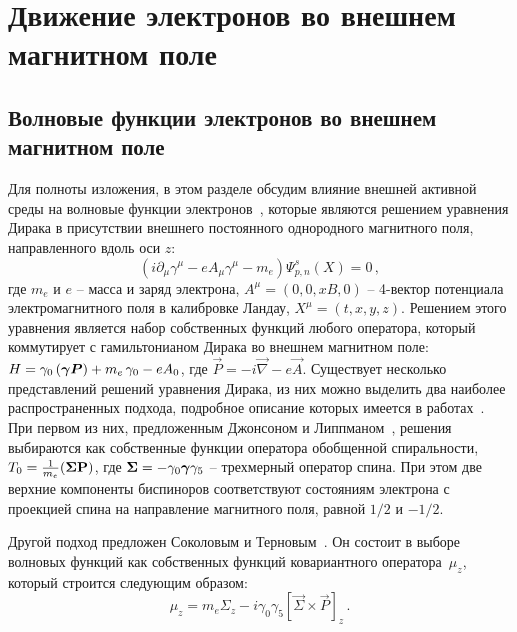\section{Движение электронов во внешнем магнитном поле}\label{Ch:Fermion}
\subsection{Волновые функции электронов во внешнем магнитном поле}
Для полноты изложения, в этом разделе обсудим влияние внешней активной среды на волновые функции электронов~\cite{KM_Book_2013}, которые являются решением уравнения Дирака в присутствии внешнего постоянного однородного магнитного поля, направленного вдоль оси $z$:
\begin{equation}\label{eq:Dirac}
	(i\partial_\mu \gamma^\mu -e A_\mu \gamma^\mu - m_e) \Psi^s_{p,n}(X)=0\, ,
\end{equation}
где $m_e$ и $e$ -- масса и заряд электрона, $A^\mu=\left(0,0,xB,0\right)$ -- 4-вектор потенциала электромагнитного поля в калибровке 
Ландау, $X^\mu=\left(t,x,y,z\right)$. Решением этого уравнения является набор собственных функций любого оператора, который 
коммутирует с гамильтонианом Дирака во внешнем магнитном поле: $H = \gamma_0 
\left( {\boldsymbol \gamma} {\boldsymbol P} \right) + m_e \, \gamma_0 -e A_0$, где $\vec{P} 
= -i \vec{\nabla} -e \vec{A}$. Существует несколько представлений решений 
уравнения Дирака, из них можно выделить два наиболее распространенных подхода, 
подробное описание которых имеется в 
работах~\cite{Melrose:1983,Sokolov:1986,Kuznetsov:2003,Bhattacharya:2004,Balantsev:2011,KM_Book_2013}.
 При первом из них, предложенным Джонсоном и Липпманом~\cite{Johnson:1949}, 
решения выбираются как собственные функции оператора обобщенной спиральности, 
$T_0 = \frac{1}{m_e} (\boldsymbol\Sigma \mathbf{P})$, где $\boldsymbol\Sigma = - \gamma_0 
\boldsymbol\gamma \gamma_5$  -- трехмерный оператор спина. При этом две верхние 
компоненты биспиноров соответствуют состояниям электрона с проекцией спина на 
направление магнитного поля, равной $1/2$ и   $-1/2$.

Другой подход предложен Соколовым и Терновым~\cite{Sokolov:1968}. Он состоит в выборе волновых функций как собственных функций ковариантного оператора~$\mu_z$, который строится следующим образом: 
\begin{equation}\label{eq:muz}
	\mu_z=m_e \Sigma_z - i \gamma_0\gamma_5\left[\vec{\Sigma}\times \vec{P}\right]_z\, .
\end{equation}

